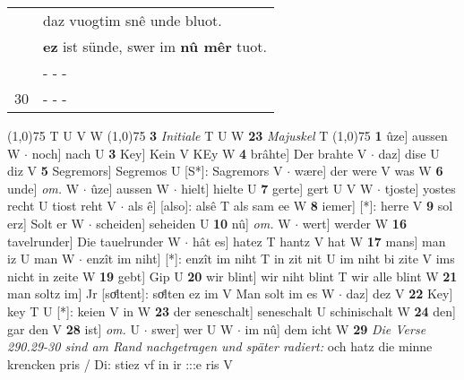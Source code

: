 \documentclass[8pt,a4paper,notitlepage]{article}
\begin{document}
\begin{table}[ht]
\begin{minipage}[t]{0.5\linewidth}
\begin{tabular}{rl}
 & daz vuogtim snê unde bluot.\\ 
 & \textbf{ez} ist sünde, swer im \textbf{nû mêr} tuot.\\ 
 & \multicolumn{1}{l}{ - - - }\\ 
30 & \multicolumn{1}{l}{ - - - }\\ 
\end{tabular}
\scriptsize
\line(1,0){75} \newline
T U V W \newline
\line(1,0){75} \newline
\textbf{3} \textit{Initiale} T U W  \textbf{23} \textit{Majuskel} T  \newline
\line(1,0){75} \newline
\textbf{1} ûze] aussen W  $\cdot$ noch] nach U \textbf{3} Key] Kein V KEy W \textbf{4} brâhte] Der brahte V  $\cdot$ daz] dise U diz V \textbf{5} Segremors] Segremos U [S*]: Sagremors V  $\cdot$ wære] der were V was W \textbf{6} unde] \textit{om.} W  $\cdot$ ûze] aussen W  $\cdot$ hielt] hielte U \textbf{7} gerte] gert U V W  $\cdot$ tjoste] yostes recht U tiost reht V  $\cdot$ als ê] [also]: alsê T als sam ee W \textbf{8} iemer] [*]: herre V \textbf{9} sol erz] Solt er W  $\cdot$ scheiden] seheiden U \textbf{10} nû] \textit{om.} W  $\cdot$ wert] werder W \textbf{16} tavelrunder] Die tauelrunder W  $\cdot$ hât es] hatez T hantz V hat W \textbf{17} mans] man iz U man W  $\cdot$ enzît im niht] [*]: enzît im niht T in zit nit U im niht bi zite V ims nicht in zeite W \textbf{19} gebt] Gip U \textbf{20} wir blint] wir niht blint T wir alle blint W \textbf{21} man soltz im] Jr [soͤltent]: soͤlten ez im V Man solt im es W  $\cdot$ daz] dez V \textbf{22} Key] key T U [*]: keien V in W \textbf{23} der seneschalt] seneschalt U schinischalt W \textbf{24} den] gar den V \textbf{28} ist] \textit{om.} U  $\cdot$ swer] wer U W  $\cdot$ im nû] dem icht W \textbf{29} \textit{Die Verse 290.29-30 sind am Rand nachgetragen und später radiert:} och hatz die minne krencken pris / Di: stiez vf in ir :::e ris V  \newline
\end{minipage}
\end{table}
\end{document}
